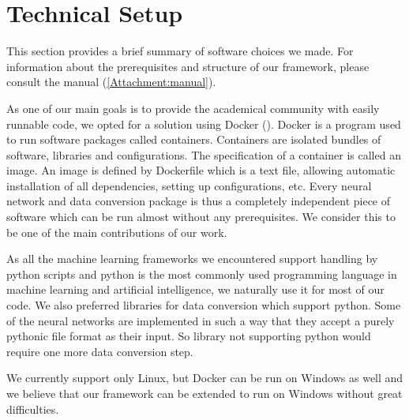 \section{Technical Setup}
This section provides a brief summary of software choices we made. For information about the prerequisites and structure of our framework, please consult the manual (\autoref{Attachment:manual}). \par
As one of our main goals is to provide the academical community with easily runnable code, we opted for a solution using Docker (\cite{merkel_docker:_2014}). Docker is a program used to run software packages called containers. Containers are isolated bundles of software, libraries and configurations. The specification of a container is called an image. An image is defined by Dockerfile which is a text file, allowing automatic installation of all dependencies, setting up configurations, etc. Every neural network and data conversion package is thus a completely independent piece of software which can be run almost without any prerequisites. We consider this to be one of the main contributions of our work. \par
As all the machine learning frameworks we encountered support handling by python scripts and python is the most commonly used programming language in machine learning and artificial intelligence, we naturally use it for most of our code. We also preferred libraries for data conversion which support python. Some of the neural networks are implemented in such a way that they accept a purely pythonic file format as their input. So library not supporting python would require one more data conversion step.\par
We currently support only Linux, but Docker can be run on Windows as well and we believe that our framework can be extended to run on Windows without great difficulties. 
